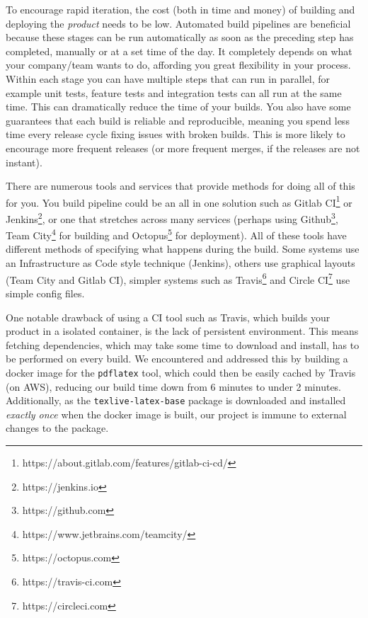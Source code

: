 To encourage rapid iteration, the cost (both in time and money) of building and deploying the \textit{product} needs to be low.
Automated build pipelines are beneficial because these stages can be run automatically as soon as the preceding step has completed,
manually or at a set time of the day.
It completely depends on what your company/team wants to do, affording you great flexibility in your process.
Within each stage you can have multiple steps that can run in parallel,
for example unit tests, feature tests and integration tests can all run at the same time.
This can dramatically reduce the time of your builds.
You also have some guarantees that each build is reliable and reproducible,
meaning you spend less time every release cycle fixing issues with broken builds.
This is more likely to encourage more frequent releases (or more frequent merges, if the releases are not instant).
\par
There are numerous tools and services that provide methods for doing all of this for you.
You build pipeline could be an all in one solution such as Gitlab CI\footnote{\label{gitlab-ci}https://about.gitlab.com/features/gitlab-ci-cd/} or Jenkins\footnote{\label{jenkins}https://jenkins.io},
or one that stretches across many services (perhaps using Github\footnote{\label{github}https://github.com},
Team City\footnote{\label{team-city}https://www.jetbrains.com/teamcity/} for building and Octopus\footnote{\label{octopus}https://octopus.com} for deployment).
All of these tools have different methods of specifying what happens during the build.
Some systems use an Infrastructure as Code style technique (Jenkins),
others use graphical layouts (Team City and Gitlab CI),
simpler systems such as Travis\footnote{https://travis-ci.com} and Circle CI\footnote{https://circleci.com} use simple config files.
\par
One notable drawback of using a CI tool such as Travis, which builds your product in a isolated container, is the lack of persistent environment. This means fetching dependencies, which may take some time to download and install, has to be performed on every build. We encountered and addressed this by building a docker image for the \texttt{pdflatex} tool, which could then be easily cached by Travis (on AWS), reducing our build time down from 6 minutes to under 2 minutes.
Additionally, as the \texttt{texlive-latex-base} package is downloaded and installed \textit{exactly once} when the docker image is built, our project is    immune to external changes to the package. 
